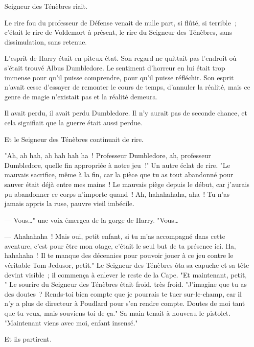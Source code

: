 
 Seigneur des Ténèbres riait.

\hplettrineextrapara
Le rire fou du professeur de Défense venait de nulle part, si flûté, si terrible~; c'était le rire de Voldemort à présent, le rire du Seigneur des Ténèbres, sans dissimulation, sans retenue.

L'esprit de Harry était en piteux état. Son regard ne quittait pas l'endroit où s'était trouvé Albus Dumbledore. Le sentiment d'horreur en lui était trop immense pour qu'il puisse comprendre, pour qu'il puisse réfléchir. Son esprit n'avait cesse d'essayer de remonter le cours de temps, d'annuler la réalité, mais ce genre de magie n'existait pas et la réalité demeura.

Il avait perdu, il avait perdu Dumbledore. Il n'y aurait pas de seconde chance, et cela signifiait que la guerre était aussi perdue.

Et le Seigneur des Ténèbres continuait de rire.

"Ah, ah hah, ah hah hah ha~! Professeur Dumbledore, ah, professeur Dumbledore, quelle fin appropriée à notre jeu~!" Un autre éclat de rire. "Le mauvais sacrifice, même à la fin, car la pièce que tu as tout abandonné pour sauver était déjà entre mes mains~! Le mauvais piège depuis le début, car j'aurais pu abandonner ce corps n'importe quand~! Ah, hahahahaha, aha~! Tu n'as jamais appris la ruse, pauvre vieil imbécile.

--- Vous…" une voix émergea de la gorge de Harry. "Vous…

--- Ahahahaha~! Mais oui, petit enfant, si tu m'as accompagné dans cette aventure, c'est pour être mon otage, c'était le seul but de ta présence ici. Ha, hahahaha~! Il te manque des décennies pour pouvoir jouer à ce jeu contre le véritable Tom Jedusor, petit." Le Seigneur des Ténèbres ôta sa capuche et sa tête devint visible~; il commença à enlever le reste de la Cape. "Et maintenant, petit, " Le sourire du Seigneur des Ténèbres était froid, très froid. "J'imagine que tu as des doutes~? Rends-toi bien compte que je pourrais te tuer sur-le-champ, car il n'y a plus de directeur à Poudlard pour s'en rendre compte. Doutes de moi tant que tu veux, mais souviens toi de ça." Sa main tenait à nouveau le pistolet. "Maintenant viens avec moi, enfant insensé."

Et ils partirent.

